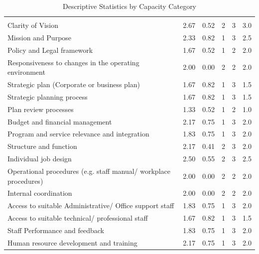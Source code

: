 \documentclass[
  10pt,
]{report}
\begin{document}
\begin{longtable}[t]{>{\raggedright\arraybackslash}p{6cm}rrrrr}

\caption{\label{tbl-desc-stats}Descriptive Statistics by Capacity
Category}

\tabularnewline

\\
\toprule
\cellcolor[HTML]{006498}{\textcolor{white}{\textbf{Category}}} & \cellcolor[HTML]{006498}{\textcolor{white}{\textbf{Mean}}} & \cellcolor[HTML]{006498}{\textcolor{white}{\textbf{SD}}} & \cellcolor[HTML]{006498}{\textcolor{white}{\textbf{Min}}} & \cellcolor[HTML]{006498}{\textcolor{white}{\textbf{Max}}} & \cellcolor[HTML]{006498}{\textcolor{white}{\textbf{Median}}}\\
\midrule
Clarity of Vision & 2.67 & 0.52 & 2 & 3 & 3.0\\
Mission and Purpose & 2.33 & 0.82 & 1 & 3 & 2.5\\
Policy and Legal framework & 1.67 & 0.52 & 1 & 2 & 2.0\\
Responsiveness to changes in the operating environment & 2.00 & 0.00 & 2 & 2 & 2.0\\
Strategic plan (Corporate or business plan) & 1.67 & 0.82 & 1 & 3 & 1.5\\
\addlinespace
Strategic planning process & 1.67 & 0.82 & 1 & 3 & 1.5\\
Plan review processes & 1.33 & 0.52 & 1 & 2 & 1.0\\
Budget and financial management & 2.17 & 0.75 & 1 & 3 & 2.0\\
Program and service relevance and integration & 1.83 & 0.75 & 1 & 3 & 2.0\\
Structure and function & 2.17 & 0.41 & 2 & 3 & 2.0\\
\addlinespace
Individual job design & 2.50 & 0.55 & 2 & 3 & 2.5\\
Operational procedures (e.g. staff manual/ workplace procedures) & 2.00 & 0.00 & 2 & 2 & 2.0\\
Internal coordination & 2.00 & 0.00 & 2 & 2 & 2.0\\
Access to suitable Administrative/ Office support staff & 1.83 & 0.75 & 1 & 3 & 2.0\\
Access to suitable technical/ professional staff & 1.67 & 0.82 & 1 & 3 & 1.5\\
\addlinespace
Staff Performance and feedback & 1.83 & 0.75 & 1 & 3 & 2.0\\
Human resource development and training & 2.17 & 0.75 & 1 & 3 & 2.0\\

\end{longtable}
\end{document}
